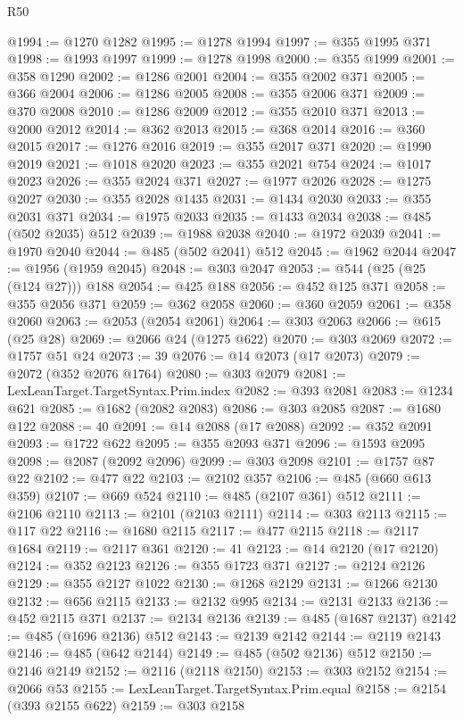 \begin{lexlean}{R50}
\begin{coremodule}
@1994 := @1270 @1282
@1995 := @1278 @1994
@1997 := @355 @1995 @371
@1998 := @1993 @1997
@1999 := @1278 @1998
@2000 := @355 @1999
@2001 := @358 @1290
@2002 := @1286 @2001
@2004 := @355 @2002 @371
@2005 := @366 @2004
@2006 := @1286 @2005
@2008 := @355 @2006 @371
@2009 := @370 @2008
@2010 := @1286 @2009
@2012 := @355 @2010 @371
@2013 := @2000 @2012
@2014 := @362 @2013
@2015 := @368 @2014
@2016 := @360 @2015
@2017 := @1276 @2016
@2019 := @355 @2017 @371
@2020 := @1990 @2019
@2021 := @1018 @2020
@2023 := @355 @2021 @754
@2024 := @1017 @2023
@2026 := @355 @2024 @371
@2027 := @1977 @2026
@2028 := @1275 @2027
@2030 := @355 @2028 @1435
@2031 := @1434 @2030
@2033 := @355 @2031 @371
@2034 := @1975 @2033
@2035 := @1433 @2034
@2038 := @485 (@502 @2035) @512
@2039 := @1988 @2038
@2040 := @1972 @2039
@2041 := @1970 @2040
@2044 := @485 (@502 @2041) @512
@2045 := @1962 @2044
@2047 := @1956 (@1959 @2045)
@2048 := @303 @2047
@2053 := @544 (@25 (@25 (@124 @27))) @188
@2054 := @425 @188
@2056 := @452 @125 @371
@2058 := @355 @2056 @371
@2059 := @362 @2058
@2060 := @360 @2059
@2061 := @358 @2060
@2063 := @2053 (@2054 @2061)
@2064 := @303 @2063
@2066 := @615 (@25 @28)
@2069 := @2066 @24 (@1275 @622)
@2070 := @303 @2069
@2072 := @1757 @51 @24
@2073 := 39
@2076 := @14 @2073 (@17 @2073)
@2079 := @2072 (@352 @2076 @1764)
@2080 := @303 @2079
@2081 := LexLeanTarget.TargetSyntax.Prim.index
@2082 := @393 @2081
@2083 := @1234 @621
@2085 := @1682 (@2082 @2083)
@2086 := @303 @2085
@2087 := @1680 @122
@2088 := 40
@2091 := @14 @2088 (@17 @2088)
@2092 := @352 @2091
@2093 := @1722 @622
@2095 := @355 @2093 @371
@2096 := @1593 @2095
@2098 := @2087 (@2092 @2096)
@2099 := @303 @2098
@2101 := @1757 @87 @22
@2102 := @477 @22
@2103 := @2102 @357
@2106 := @485 (@660 @613 @359)
@2107 := @669 @524
@2110 := @485 (@2107 @361) @512
@2111 := @2106 @2110
@2113 := @2101 (@2103 @2111)
@2114 := @303 @2113
@2115 := @117 @22
@2116 := @1680 @2115
@2117 := @477 @2115
@2118 := @2117 @1684
@2119 := @2117 @361
@2120 := 41
@2123 := @14 @2120 (@17 @2120)
@2124 := @352 @2123
@2126 := @355 @1723 @371
@2127 := @2124 @2126
@2129 := @355 @2127 @1022
@2130 := @1268 @2129
@2131 := @1266 @2130
@2132 := @656 @2115
@2133 := @2132 @995
@2134 := @2131 @2133
@2136 := @452 @2115 @371
@2137 := @2134 @2136
@2139 := @485 (@1687 @2137)
@2142 := @485 (@1696 @2136) @512
@2143 := @2139 @2142
@2144 := @2119 @2143
@2146 := @485 (@642 @2144)
@2149 := @485 (@502 @2136) @512
@2150 := @2146 @2149
@2152 := @2116 (@2118 @2150)
@2153 := @303 @2152
@2154 := @2066 @53
@2155 := LexLeanTarget.TargetSyntax.Prim.equal
@2158 := @2154 (@393 @2155 @622)
@2159 := @303 @2158

\end{coremodule}
\end{lexlean}
